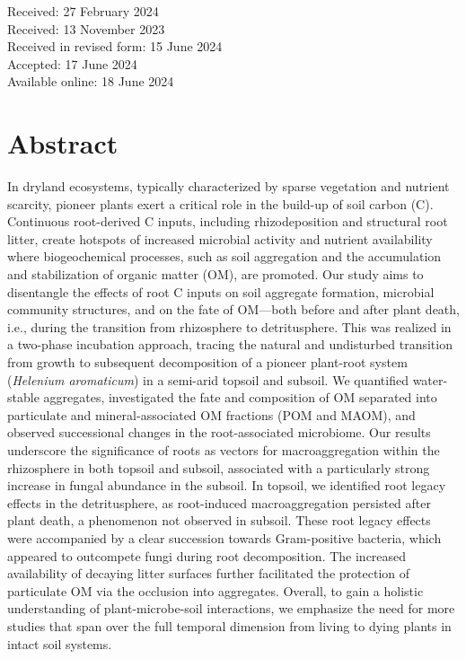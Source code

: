 \vspace{0.4cm}

\begin{flushleft}
    Received: 27 February 2024\\
    Received: 13 November 2023\\ 
    Received in revised form: 15 June 2024\\
    Accepted: 17 June 2024\\
    Available online: 18 June 2024
\end{flushleft}
  
\cleardoublepage

\section*{Abstract}

In dryland ecosystems, typically characterized by sparse vegetation and nutrient scarcity, pioneer plants exert a critical role in the build-up of soil carbon (C). Continuous root-derived C inputs, including rhizodeposition and structural root litter, create hotspots of increased microbial activity and nutrient availability where biogeochemical processes, such as soil aggregation and the accumulation and stabilization of organic matter (OM), are promoted. Our study aims to disentangle the effects of root C inputs on soil aggregate formation, microbial community structures, and on the fate of OM—both before and after plant death, i.e., during the transition from rhizosphere to detritusphere. This was realized in a two-phase incubation approach, tracing the natural and undisturbed transition from growth to subsequent decomposition of a pioneer plant-root system (\textit{Helenium aromaticum}) in a semi-arid topsoil and subsoil. We quantified water-stable aggregates, investigated the fate and composition of OM separated into particulate and mineral-associated OM fractions (POM and MAOM), and observed successional changes in the root-associated microbiome. Our results underscore the significance of roots as vectors for macroaggregation within the rhizosphere in both topsoil and subsoil, associated with a particularly strong increase in fungal abundance in the subsoil. In topsoil, we identified root legacy effects in the detritusphere, as root-induced macroaggregation persisted after plant death, a phenomenon not observed in subsoil. These root legacy effects were accompanied by a clear succession towards Gram-positive bacteria, which appeared to outcompete fungi during root decomposition. The increased availability of decaying litter surfaces further facilitated the protection of particulate OM via the occlusion into aggregates. Overall, to gain a holistic understanding of plant-microbe-soil interactions, we emphasize the need for more studies that span over the full temporal dimension from living to dying plants in intact soil systems.

